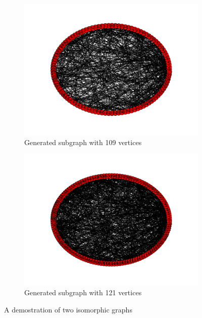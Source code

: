 \begin{figure}[!htbp]
\begin{subfigure}[b]{0.6\textwidth}
    \includegraphics[width=\textwidth]{109}
    \caption{Generated subgraph with 109 vertices}
    \label{fig:109}
  \end{subfigure}
  \hfill
  \begin{subfigure}[b]{0.6\textwidth}
    \includegraphics[width=\textwidth]{121}
    \caption{Generated subgraph with 121 vertices}
    \label{fig:121}
  \end{subfigure}
  \caption{A demostration of two isomorphic graphs}
  \label{fig:generatedSubs}  
\end{figure}

\newpage